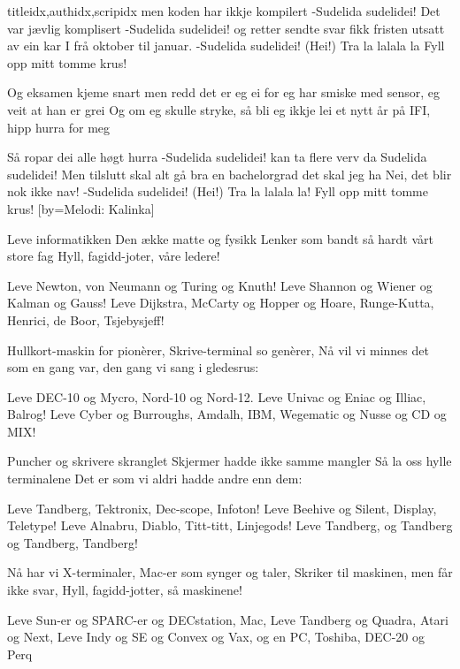 \documentclass[14pt,letterpaper,norsk]{article}
\begin{document}
\begin{songs}{titleidx,authidx,scripidx}
\beginchorus
men koden har ikkje kompilert
-Sudelida sudelidei!
Det var jævlig komplisert
-Sudelida sudelidei!
og retter sendte svar
fikk fristen utsatt av ein kar
I frå oktober til januar.
-Sudelida sudelidei! (Hei!)
Tra la lalala la
Fyll opp mitt tomme krus!
\endchorus

\beginverse
Og eksamen kjeme snart men redd det er eg ei
for eg har smiske med sensor, eg veit at han er grei
Og om eg skulle stryke, så bli eg ikkje lei
et nytt år på IFI, hipp hurra for meg
\endverse

\beginchorus
Så ropar dei alle høgt hurra
-Sudelida sudelidei!
kan ta flere verv da
Sudelida sudelidei!
Men tilslutt skal alt gå bra
en bachelorgrad det skal jeg ha
Nei, det blir nok ikke nav!
-Sudelida sudelidei! (Hei!)
Tra la lalala la!
Fyll opp mitt tomme krus!
\endchorus
\endsong
{}[by=Melodi: Kalinka]

\beginverse
Leve informatikken
Den ække matte og fysikk
Lenker som bandt så hardt vårt store fag
Hyll, fagidd-joter, våre ledere!
\endverse

\beginchorus
Leve Newton, von Neumann og Turing og Knuth!
Leve Shannon og Wiener og Kalman og Gauss!
Leve Dijkstra, McCarty og Hopper og Hoare,
Runge-Kutta, Henrici, de Boor, Tsjebysjeff!
\endchorus

\beginverse
Hullkort-maskin for pionèrer,
Skrive-terminal so genèrer,
Nå vil vi minnes det som en gang var,
den gang vi sang i gledesrus:
\endverse

\beginchorus
Leve DEC-10 og Mycro, Nord-10 og Nord-12.
Leve Univac og Eniac og Illiac, Balrog!
Leve Cyber og Burroughs, Amdalh, IBM,
Wegematic og Nusse og CD og MIX!
\endchorus

\beginverse
Puncher og skrivere skranglet
Skjermer hadde ikke samme mangler
Så la oss hylle terminalene
Det er som vi aldri hadde andre enn dem:
\endverse

\beginchorus
Leve Tandberg, Tektronix, Dec-scope, Infoton!
Leve Beehive og Silent, Display, Teletype!
Leve Alnabru, Diablo, Titt-titt, Linjegods!
Leve Tandberg, og Tandberg og Tandberg, Tandberg!
\endchorus

\beginverse
Nå har vi X-terminaler,
Mac-er som synger og taler,
Skriker til maskinen, men får ikke svar,
Hyll, fagidd-jotter, så maskinene!
\endverse

\beginchorus
Leve Sun-er og SPARC-er og DECstation, Mac,
Leve Tandberg og Quadra, Atari og Next,
Leve Indy og SE og Convex og Vax,
og en PC, Toshiba, DEC-20 og Perq
\endchorus


\end{songs}
\end{document}
